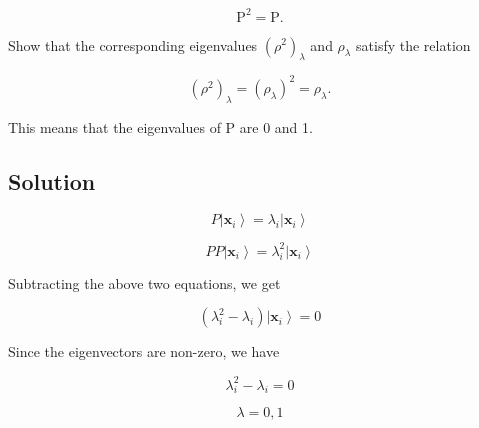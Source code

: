\documentclass[12pt]{article}
\begin{document}
\[
    \mathrm{P}^2=\mathrm{P} .
\]

Show that the corresponding eigenvalues \({\left(\rho^2\right)}_\lambda \) and \(\rho_\lambda \) satisfy the relation

\[
    {\left(\rho^2\right)}_\lambda={\left(\rho_\lambda\right)}^2=\rho_\lambda .
\]

This means that the eigenvalues of \(\mathrm{P}\) are 0 and 1.

\subsection{Solution}

\[
    P \left|\mathbf{x}_i\right\rangle = \lambda_i \left|\mathbf{x}_i\right\rangle
\]

\[
    P P \left|\mathbf{x}_i\right\rangle = \lambda_i^2 \left|\mathbf{x}_i\right\rangle
\]

Subtracting the above two equations, we get

\[
    \left(\lambda_i^2 - \lambda_i\right) \left|\mathbf{x}_i\right\rangle = 0
\]

Since the eigenvectors are non-zero, we have

\[
    \lambda_i^2 - \lambda_i = 0
\]

\[
    \lambda = 0, 1
\]


\newpage


\nocite{arfken2013mathematical}
\nocite{El-Deeb_PEU-356_Assignments}
\end{document}
